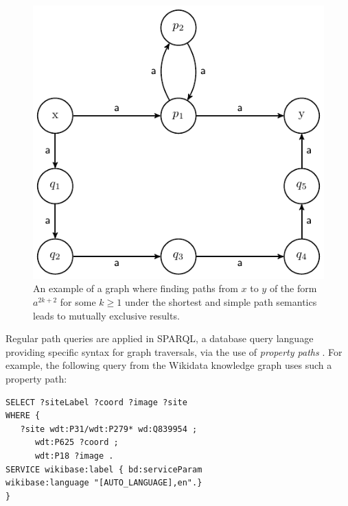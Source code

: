 \documentclass{article}
\begin{document}
\begin{figure}
    \label{fig:shortest_simple}
    \centering

    \includegraphics{figures/shortest_simple.pdf}
    \caption{An example of a graph where finding paths from $x$ to $y$ of the form $a^{2k+2}$ for some $k \geq 1$ under the shortest and simple path semantics leads to mutually exclusive results.}

\end{figure}

Regular path queries are applied in SPARQL, a database query language providing specific syntax for graph traversals, via the use of \emph{property paths} \cite{SPARQLQueryLanguage}. For example, the following query from the Wikidata knowledge graph \cite{WikidataSPARQLQuery} uses such a property path:


\begin{lstlisting}[language=SPARQL]
SELECT ?siteLabel ?coord ?image ?site
WHERE {
   ?site wdt:P31/wdt:P279* wd:Q839954 ;
      wdt:P625 ?coord ;
      wdt:P18 ?image .
SERVICE wikibase:label { bd:serviceParam
wikibase:language "[AUTO_LANGUAGE],en".}
}
\end{lstlisting}
\end{document}
